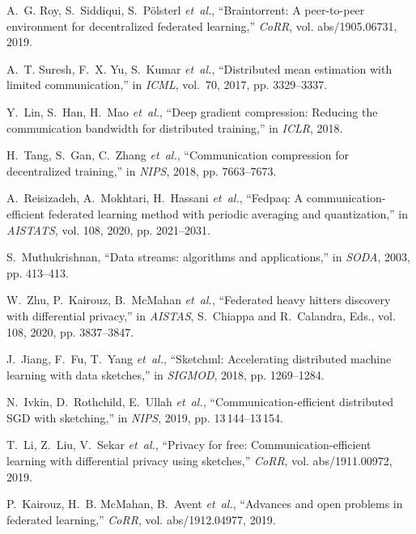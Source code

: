 \documentclass[11pt]{article}
\begin{document}
\begin{thebibliography}{10}
\begin{small}
		A.~G. Roy, S.~Siddiqui, S.~P{\"{o}}lsterl \emph{et~al.}, ``Braintorrent: {A}
		peer-to-peer environment for decentralized federated learning,'' \emph{CoRR},
		vol. abs/1905.06731, 2019.
		
		A.~T. Suresh, F.~X. Yu, S.~Kumar \emph{et~al.}, ``Distributed mean estimation
		with limited communication,'' in \emph{ICML}, vol.~70, 2017, pp. 3329--3337.
		
		Y.~Lin, S.~Han, H.~Mao \emph{et~al.}, ``Deep gradient compression: Reducing the
		communication bandwidth for distributed training,'' in \emph{ICLR}, 2018.
		
		H.~Tang, S.~Gan, C.~Zhang \emph{et~al.}, ``Communication compression for
		decentralized training,'' in \emph{NIPS}, 2018, pp. 7663--7673.
		
		A.~Reisizadeh, A.~Mokhtari, H.~Hassani \emph{et~al.}, ``Fedpaq: {A}
		communication-efficient federated learning method with periodic averaging and
		quantization,'' in \emph{AISTATS}, vol. 108, 2020, pp. 2021--2031.
		
		S.~Muthukrishnan, ``Data streams: algorithms and applications,'' in
		\emph{SODA}, 2003, pp. 413--413.
		
		W.~Zhu, P.~Kairouz, B.~McMahan \emph{et~al.}, ``Federated heavy hitters
		discovery with differential privacy,'' in \emph{AISTAS}, S.~Chiappa and
		R.~Calandra, Eds., vol. 108, 2020, pp. 3837--3847.
		
		J.~Jiang, F.~Fu, T.~Yang \emph{et~al.}, ``Sketchml: Accelerating distributed
		machine learning with data sketches,'' in \emph{SIGMOD}, 2018, pp.
		1269--1284.
		
		N.~Ivkin, D.~Rothchild, E.~Ullah \emph{et~al.}, ``Communication-efficient
		distributed {SGD} with sketching,'' in \emph{NIPS}, 2019, pp.
		13\,144--13\,154.
		
		T.~Li, Z.~Liu, V.~Sekar \emph{et~al.}, ``Privacy for free:
		Communication-efficient learning with differential privacy using sketches,''
		\emph{CoRR}, vol. abs/1911.00972, 2019.
		
		P.~Kairouz, H.~B. McMahan, B.~Avent \emph{et~al.}, ``Advances and open problems
		in federated learning,'' \emph{CoRR}, vol. abs/1912.04977, 2019.
		

\end{small}
\end{thebibliography}
\end{document}
